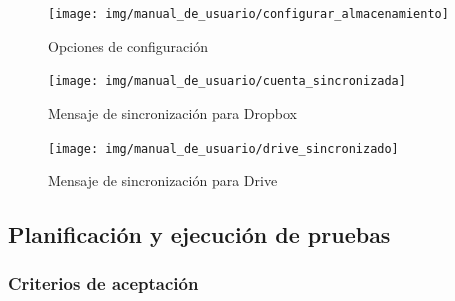     \begin{figure}
    	\centering
    	\texttt{[image: img/manual\_de\_usuario/configurar\_almacenamiento]}
    	\caption{Opciones de configuración}
    	\label{configurar_almacenamiento}
    \end{figure}
    \begin{figure}
    	\centering
    	\texttt{[image: img/manual\_de\_usuario/cuenta\_sincronizada]}
    	\caption{Mensaje de sincronización para Dropbox}
    	\label{cuenta_sincronizada}
    \end{figure}
    \begin{figure}
    	\centering
    	\texttt{[image: img/manual\_de\_usuario/drive\_sincronizado]}
    	\caption{Mensaje de sincronización para Drive}
    	\label{drive_sincronizado_sprint7}
    \end{figure}

\clearpage
\subsection{Planificación y ejecución de pruebas}
\subsubsection{Criterios de aceptación}

